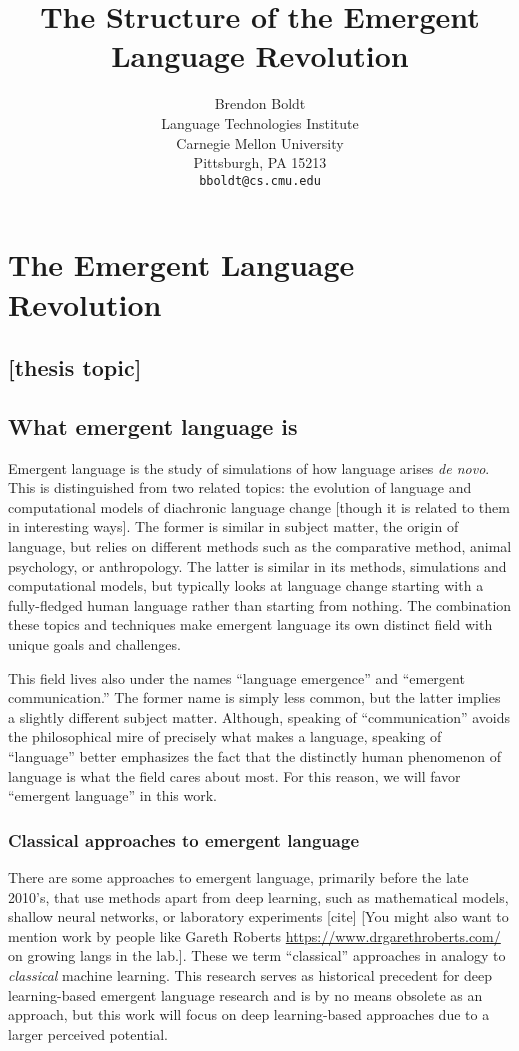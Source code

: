 \documentclass[letterpaper]{report}
\title{The Structure of the Emergent Language Revolution}
\author{%
  Brendon Boldt\\
  Language Technologies Institute\\
  Carnegie Mellon University\\
  Pittsburgh, PA 15213 \\
  \texttt{bboldt@cs.cmu.edu} \\
}
\newcommand\cmg[1]{{\color{gray}[#1]}}
\newcommand\drm[1]{{\color{red}[#1]}}
\begin{document}
\maketitle

\setcounter{tocdepth}{1}
\tableofcontents



\chapter{The Emergent Language Revolution}
\section{[thesis topic]}
\section{What emergent language is}
Emergent language is the study of simulations of how language arises \emph{de novo}.
This is distinguished from two related topics: the evolution of language and computational models of diachronic language change \drm{though it is related to them in interesting ways}.
The former is similar in subject matter, the origin of language, but relies on different methods such as the comparative method, animal psychology, or anthropology.
The latter is similar in its methods, simulations and computational models, but typically looks at language change starting with a fully-fledged human language rather than starting from nothing.
The combination these topics and techniques make emergent language its own distinct field with unique goals and challenges.

This field lives also under the names ``language emergence'' and ``emergent communication.''
The former name is simply less common, but the latter implies a slightly different subject matter.
Although, speaking of ``communication'' avoids the philosophical mire of precisely what makes a language, speaking of ``language'' better emphasizes the fact that the distinctly human phenomenon of language is what the field cares about most.
For this reason, we will favor ``emergent language'' in this work.

\subsection{Classical approaches to emergent language}
There are some approaches to emergent language, primarily before the late 2010's, that use methods apart from deep learning, such as mathematical models, shallow neural networks, or laboratory experiments \cmg{cite} \drm{You might also want to mention work by people like Gareth Roberts \url{https://www.drgarethroberts.com/} on growing langs in the lab.}.
These we term ``classical'' approaches in analogy to \emph{classical} machine learning.
This research serves as historical precedent for deep learning-based emergent language research and is by no means obsolete as an approach, but this work will focus on deep learning-based approaches due to a larger perceived potential.
\end{document}
